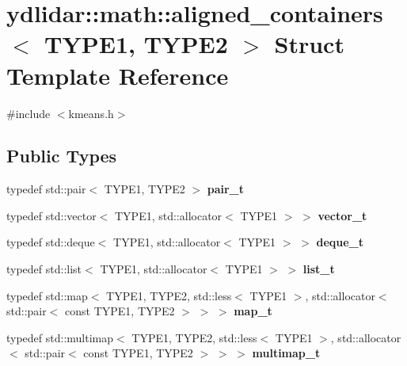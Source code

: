 \hypertarget{structydlidar_1_1math_1_1aligned__containers}{}\section{ydlidar\+:\+:math\+:\+:aligned\+\_\+containers$<$ T\+Y\+P\+E1, T\+Y\+P\+E2 $>$ Struct Template Reference}
\label{structydlidar_1_1math_1_1aligned__containers}


{\ttfamily \#include $<$kmeans.\+h$>$}

\subsection*{Public Types}
\begin{DoxyCompactItemize}
\item 
typedef std\+::pair$<$ T\+Y\+P\+E1, T\+Y\+P\+E2 $>$ {\bfseries pair\+\_\+t}\hypertarget{structydlidar_1_1math_1_1aligned__containers_aef4fb79137cd55476ba34110fbdd6dbb}{}\label{structydlidar_1_1math_1_1aligned__containers_aef4fb79137cd55476ba34110fbdd6dbb}

\item 
typedef std\+::vector$<$ T\+Y\+P\+E1, std\+::allocator$<$ T\+Y\+P\+E1 $>$ $>$ {\bfseries vector\+\_\+t}\hypertarget{structydlidar_1_1math_1_1aligned__containers_a0386d8e705bc5c4a02135a9e8bdda8be}{}\label{structydlidar_1_1math_1_1aligned__containers_a0386d8e705bc5c4a02135a9e8bdda8be}

\item 
typedef std\+::deque$<$ T\+Y\+P\+E1, std\+::allocator$<$ T\+Y\+P\+E1 $>$ $>$ {\bfseries deque\+\_\+t}\hypertarget{structydlidar_1_1math_1_1aligned__containers_af8a00664fbb18337f5b2ec97660002cf}{}\label{structydlidar_1_1math_1_1aligned__containers_af8a00664fbb18337f5b2ec97660002cf}

\item 
typedef std\+::list$<$ T\+Y\+P\+E1, std\+::allocator$<$ T\+Y\+P\+E1 $>$ $>$ {\bfseries list\+\_\+t}\hypertarget{structydlidar_1_1math_1_1aligned__containers_a3779fa9f0fdfa2b2751cd8bc256687cd}{}\label{structydlidar_1_1math_1_1aligned__containers_a3779fa9f0fdfa2b2751cd8bc256687cd}

\item 
typedef std\+::map$<$ T\+Y\+P\+E1, T\+Y\+P\+E2, std\+::less$<$ T\+Y\+P\+E1 $>$, std\+::allocator$<$ std\+::pair$<$ const T\+Y\+P\+E1, T\+Y\+P\+E2 $>$ $>$ $>$ {\bfseries map\+\_\+t}\hypertarget{structydlidar_1_1math_1_1aligned__containers_a441eb6cc71b2eed1869ed7c362b3aed4}{}\label{structydlidar_1_1math_1_1aligned__containers_a441eb6cc71b2eed1869ed7c362b3aed4}

\item 
typedef std\+::multimap$<$ T\+Y\+P\+E1, T\+Y\+P\+E2, std\+::less$<$ T\+Y\+P\+E1 $>$, std\+::allocator$<$ std\+::pair$<$ const T\+Y\+P\+E1, T\+Y\+P\+E2 $>$ $>$ $>$ {\bfseries multimap\+\_\+t}\hypertarget{structydlidar_1_1math_1_1aligned__containers_a910ae5619fd48f94f7479ab51887a118}{}\label{structydlidar_1_1math_1_1aligned__containers_a910ae5619fd48f94f7479ab51887a118}

\end{DoxyCompactItemize}



